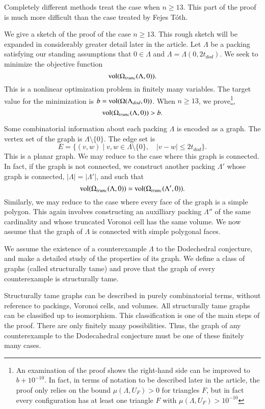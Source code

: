 Completely different methods treat the case when $n\ge 13$.  
This part of the proof is
much more difficult than the case treated by Fejes T\'oth.

We give a sketch of the proof of the case $n\ge 13$.   This
rough sketch will be expanded in considerably greater detail later
in the article.
Let $\Lambda$ be a packing satisfying our standing assumptions
that $0\in\Lambda$ and $\Lambda = \Lambda(0,2t_{dod})$.
We seek to minimize the objective function 
$$
{\operatorname{vol}}(\Omega_{trunc}(\Lambda,0)).
$$
This is a nonlinear optimization problem in finitely many variables.
The target value for the minimization is $b={\operatorname{vol}}(\Omega(\Lambda_{dod},0))$.  When $n\ge 13$, we prove\footnote{An examination of the proof shows the right-hand side can be improved to $b+10^{-10}$.  In fact, in terms of notation to be described later in the article, the proof only
relies on the bound $\mu(\Lambda,U_F) >0$ for triangles $F$, but in fact every configuration has at least one triangle $F$ with $\mu(\Lambda,U_F) > 10^{-10}$},
   $$
   {\operatorname{vol}}(\Omega_{trunc}(\Lambda,0))  > b.
   $$



Some combinatorial information about each packing $\Lambda$ is encoded
as a  graph.  The vertex set of the graph is $\Lambda\setminus\{0\}$.
The edge set is 
  $$
  E = \{(v,w) \mid v,w\in\Lambda\setminus\{0\},\quad   |v-w| \le 2t_{dod}\}.
  $$
This is a planar graph.  
We may reduce to the case where this graph is connected.  In fact,
if the graph is not connected, we construct another packing
$\Lambda'$ whose graph is connected, $|\Lambda|=|\Lambda'|$, 
and such that
$$
   {\operatorname{vol}}(\Omega_{trunc}(\Lambda,0)) = {\operatorname{vol}}(\Omega_{trunc}(\Lambda',0)). 
$$
Similarly, we may reduce to the case where every face of the graph
is a simple polygon.  This again involves constructing an auxilliary 
packing $\Lambda''$ of the same cardinality and whose  truncated Voronoi cell has the same volume.  We now assume that the graph of $\Lambda$ is 
connected with simple polygonal faces.

We assume the existence of a counterexample $\Lambda$ to the Dodechedral
conjecture, and make a detailed study of the properties of its
graph.  We define a class of graphs (called structurally tame) and
prove that the graph of every counterexample is structurally tame.

Structurally tame graphs can be described in purely combinatorial
terms, without reference to packings, Voronoi cells, and volumes.
All structurally tame graphs can be classified up to isomorphism.
This classification is one of the main steps of the proof.
There are only finitely many possibilities.  Thus, the graph
of any counterexample
to the Dodecahedral conjecture must be one of these finitely
many cases.

